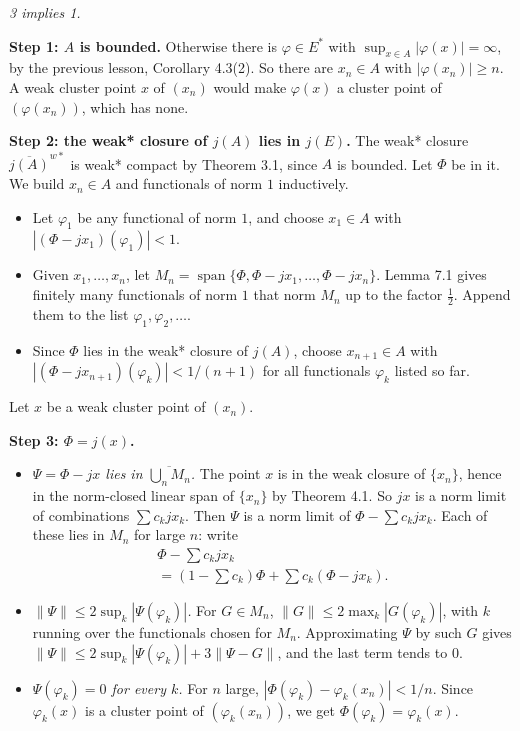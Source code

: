 \documentclass[
  english,
  11pt,
  a4paper,
]{article}
\newcounter{none} %
\providecommand{\tightlist}{%
  \setlength{\itemsep}{0pt}\setlength{\parskip}{0pt}}
\begin{document}
\emph{3 implies 1.}

\textbf{Step 1: \(A\) is bounded.} Otherwise there is \(\varphi\in E^*\)
with \(\sup_{x\in A}|\varphi(x)|=\infty\), by the previous lesson,
Corollary 4.3(2). So there are \(x_n\in A\) with
\(|\varphi(x_n)|\ge n\). A weak cluster point \(x\) of \((x_n)\) would
make \(\varphi(x)\) a cluster point of \((\varphi(x_n))\), which has
none.

\textbf{Step 2: the weak* closure of \(j(A)\) lies in \(j(E)\).} The
weak* closure \(\overline{j(A)}^{w*}\) is weak* compact by Theorem 3.1,
since \(A\) is bounded. Let \(\Phi\) be in it. We build \(x_n\in A\) and
functionals of norm \(1\) inductively.

\begin{itemize}
\tightlist
\item
  Let \(\varphi_1\) be any functional of norm \(1\), and choose
  \(x_1\in A\) with \(|(\Phi-jx_1)(\varphi_1)|<1\).
\item
  Given \(x_1,\dots,x_n\), let
  \(M_n=\operatorname{span}\{\Phi,\Phi-jx_1,\dots,\Phi-jx_n\}\). Lemma
  7.1 gives finitely many functionals of norm \(1\) that norm \(M_n\) up
  to the factor \(\frac12\). Append them to the list
  \(\varphi_1,\varphi_2,\dots\).
\item
  Since \(\Phi\) lies in the weak* closure of \(j(A)\), choose
  \(x_{n+1}\in A\) with \(|(\Phi-jx_{n+1})(\varphi_k)|<1/(n+1)\) for all
  functionals \(\varphi_k\) listed so far.
\end{itemize}

Let \(x\) be a weak cluster point of \((x_n)\).

\textbf{Step 3: \(\Phi=j(x)\).}

\begin{itemize}
\tightlist
\item
  \emph{\(\Psi=\Phi-jx\) lies in \(\overline{\bigcup_nM_n}\).} The point
  \(x\) is in the weak closure of \(\{x_n\}\), hence in the norm-closed
  linear span of \(\{x_n\}\) by Theorem 4.1. So \(jx\) is a norm limit
  of combinations \(\sum c_kjx_k\). Then \(\Psi\) is a norm limit of
  \(\Phi-\sum c_kjx_k\). Each of these lies in \(M_n\) for large \(n\):
  write \[\begin{gathered}
  \Phi-\sum c_kjx_k\\
  =(1-\sum c_k)\Phi+\sum c_k(\Phi-jx_k).
  \end{gathered}\]
\item
  \emph{\(\|\Psi\|\le2\sup_k|\Psi(\varphi_k)|\).} For \(G\in M_n\),
  \(\|G\|\le2\max_k|G(\varphi_k)|\), with \(k\) running over the
  functionals chosen for \(M_n\). Approximating \(\Psi\) by such \(G\)
  gives \(\|\Psi\|\le2\sup_k|\Psi(\varphi_k)|+3\|\Psi-G\|\), and the
  last term tends to \(0\).
\item
  \emph{\(\Psi(\varphi_k)=0\) for every \(k\).} For \(n\) large,
  \(|\Phi(\varphi_k)-\varphi_k(x_n)|<1/n\). Since \(\varphi_k(x)\) is a
  cluster point of \((\varphi_k(x_n))\), we get
  \(\Phi(\varphi_k)=\varphi_k(x)\).
\end{itemize}
\end{document}
